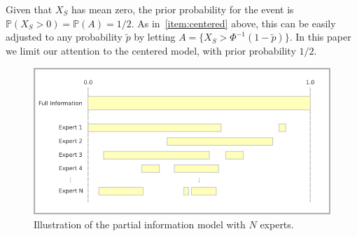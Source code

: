\documentclass[11pt]{article}
\renewcommand{\P}{\mathbb{P}}
\theoremstyle{definition}
\theoremstyle{definition}
\def\P{{\mathbb P}}
\begin{document}
Given that $X_S$ has mean zero, the prior probability for the event 
is $\P(X_S > 0) = \P(A) = 1/2$.  As in~\ref{item:centered} above, 
this can be easily adjusted to any probability $\tilde{p}$ by 
letting $A = \{ X_S > \Phi^{-1}(1-\tilde{p}) \}$.  In this paper
we limit our attention to the centered model, with prior probability $1/2$.

\begin{figure}[htbp]
   \includegraphics[width = \textwidth]{N=N} %
   \caption{Illustration of the partial information model with $N$ experts.}
   \label{diagramN}
\end{figure}
\end{document}
